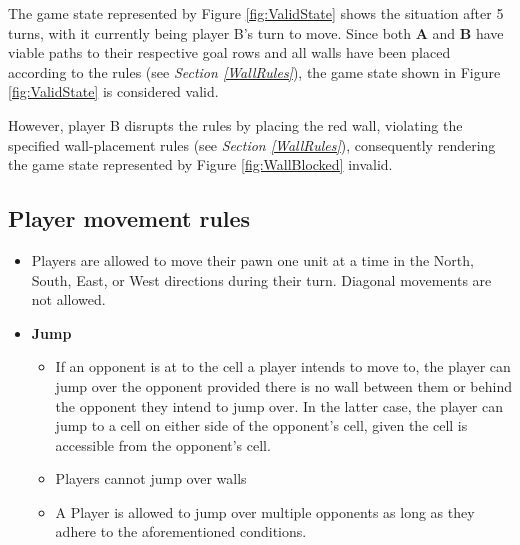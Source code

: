 The game state represented by Figure \ref{fig:ValidState} shows the situation after 5 turns, with it currently
being player B's turn to move. Since both \textbf{A} and \textbf{B} have viable paths to their respective goal
rows and all walls have been placed according to the rules (see \textit{Section \ref{WallRules}}),
the game state shown in Figure \ref{fig:ValidState} is considered valid.
\par
However, player B disrupts the rules by placing the red wall, violating the specified wall-placement rules
(see \textit{Section \ref{WallRules}}), consequently rendering the game state represented by
Figure \ref{fig:WallBlocked} invalid.

\pagebreak

\subsection{Player movement rules}
\label{PlayerMoveRules}
\begin{itemize}
    \item Players are allowed to move their pawn one unit at a time in the North, South, East, or West
        directions during their turn. Diagonal movements are not allowed.

    \item \textbf{Jump}
    \begin{itemize}
        \item If an opponent is at to the cell a player intends to move to, the player can jump over the
            opponent provided there is no wall between them or behind the opponent they intend to jump over.
            In the latter case, the player can jump to a cell on either side of the opponent's cell, given
            the cell is accessible from the opponent's cell.
        \item Players cannot jump over walls
        \item A Player is allowed to jump over multiple opponents as long as they adhere to the aforementioned
            conditions.
    \end{itemize}
\end{itemize}

